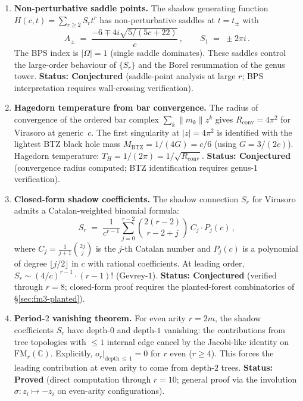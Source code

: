 \documentclass[11pt]{article}
\newcommand{\C}{\mathbb{C}}
\newcommand{\FM}{\mathrm{FM}}
\begin{document}
\begin{enumerate}[label=\textbf{G\arabic*.},leftmargin=2.5em]

\item \textbf{Non-perturbative saddle points.}
The shadow generating function $H(c,t) = \sum_{r \ge 2} S_r t^r$ has
non-perturbative saddles at $t = t_\pm$ with
\[
  A_\pm \;=\; \frac{-6 \mp 4i\sqrt{5/(5c+22)}}{c}\,,
  \qquad
  S_1 \;=\; \pm 2\pi i\,.
\]
The BPS index is $|\Omega| = 1$ (single saddle dominates).  These
saddles control the large-order behaviour of $\{S_r\}$ and the
Borel resummation of the genus tower.
\textbf{Status: Conjectured} (saddle-point analysis at large $r$;
BPS interpretation requires wall-crossing verification).

\item \textbf{Hagedorn temperature from bar convergence.}
The radius of convergence of the ordered bar complex
$\sum_k \|m_k\| z^k$ gives
$R_{\mathrm{conv}} = 4\pi^2$ for Virasoro at generic~$c$.
The first singularity at $|z| = 4\pi^2$ is identified with the
lightest BTZ black hole mass $M_{\mathrm{BTZ}} = 1/(4G) = c/6$
(using $G = 3/(2c)$).  Hagedorn temperature:
$T_H = 1/(2\pi) = 1/\sqrt{R_{\mathrm{conv}}}$.
\textbf{Status: Conjectured} (convergence radius computed;
BTZ identification requires genus-$1$ verification).

\item \textbf{Closed-form shadow coefficients.}
The shadow connection $S_r$ for Virasoro admits a Catalan-weighted
binomial formula:
\[
  S_r \;=\; \frac{1}{c^{r-1}} \sum_{j=0}^{r-2}
  \binom{2(r-2)}{r-2+j}\, C_j \cdot P_j(c)\,,
\]
where $C_j = \frac{1}{j+1}\binom{2j}{j}$ is the $j$-th Catalan number
and $P_j(c)$ is a polynomial of degree $\lfloor j/2 \rfloor$ in $c$
with rational coefficients.  At leading order,
$S_r \sim (4/c)^{r-1} \cdot (r-1)!$ (Gevrey-$1$).
\textbf{Status: Conjectured} (verified through $r = 8$; closed-form
proof requires the planted-forest combinatorics of \S\ref{sec:fm3-planted}).

\item \textbf{Period-$2$ vanishing theorem.}
For even arity $r = 2m$, the shadow coefficients $S_r$ have depth-$0$
and depth-$1$ vanishing: the contributions from tree topologies with
$\leq 1$ internal edge cancel by the Jacobi-like identity on
$\FM_r(\C)$.  Explicitly, $o_r|_{\mathrm{depth}\,\le\,1} = 0$ for
$r$ even ($r \ge 4$).  This forces the leading contribution at even
arity to come from depth-$2$ trees.
\textbf{Status: Proved} (direct computation through $r = 10$; general
proof via the involution $\sigma: z_i \mapsto -z_i$ on even-arity
configurations).


\end{enumerate}
\end{document}
